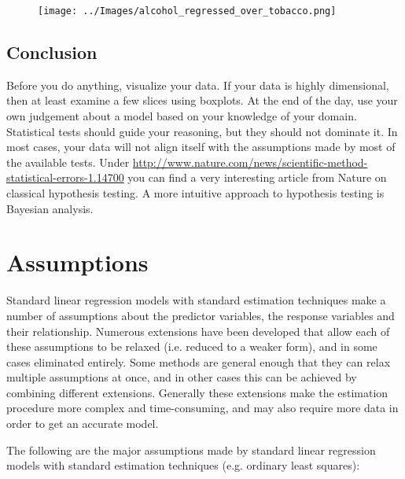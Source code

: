 \begin{figure}
  \centering
  \texttt{[image: ../Images/alcohol\_regressed\_over\_tobacco.png]}
\end{figure}

\subsection{Conclusion}

Before you do anything, visualize your data. If your data is highly dimensional, then at least examine a few slices using boxplots. At the end of the day, use your own judgement about a model based on your knowledge of your domain. Statistical tests should guide your reasoning, but they should not dominate it. In most cases, your data will not align itself with the assumptions made by most of the available tests. Under \url{http://www.nature.com/news/scientific-method-statistical-errors-1.14700} you can find a very interesting article from Nature on classical hypothesis testing. A more intuitive approach to hypothesis testing is Bayesian analysis.

\section{Assumptions} \label{sec:Assumptions}

Standard linear regression models with standard estimation techniques make a number of assumptions about the predictor variables, the response variables and their relationship.  Numerous extensions have been developed that allow each of these assumptions to be relaxed (i.e. reduced to a weaker form), and in some cases eliminated entirely.  Some methods are general enough that they can relax multiple assumptions at once, and in other cases this can be achieved by combining different extensions.  Generally these extensions make the estimation procedure more complex and time-consuming, and may also require more data in order to get an accurate model.

The following are the major assumptions made by standard linear regression models with standard estimation techniques (e.g. ordinary least squares):


